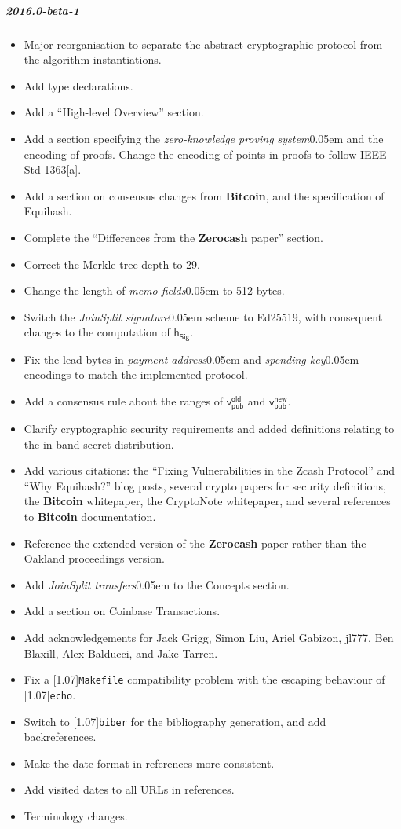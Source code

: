 \documentclass{article}
\let\oldtexttt\texttt
\renewcommand{\texttt}[1]{\scalebox{1.02}[1.07]{\oldtexttt{#1}}}
\newcommand{\term}[1]{\textsl{#1}\kern 0.05em\xspace}
\newcommand{\termbf}[1]{\textbf{#1}\xspace}
\newcommand{\Zerocash}{\termbf{Zerocash}}
\newcommand{\Bitcoin}{\termbf{Bitcoin}}
\newcommand{\joinSplitTransfers}{\term{JoinSplit transfers}}
\newcommand{\joinSplitSignature}{\term{JoinSplit signature}}
\newcommand{\zeroKnowledgeProvingSystem}{\term{zero-knowledge proving system}}
\newcommand{\paymentAddress}{\term{payment address}}
\newcommand{\spendingKey}{\term{spending key}}
\newcommand{\memos}{\term{memo fields}}
\newcommand{\hSig}{\mathsf{h_{Sig}}}
\newcommand{\vpubOld}{\mathsf{v_{pub}^{old}}}
\newcommand{\vpubNew}{\mathsf{v_{pub}^{new}}}
\begin{document}
\subparagraph{2016.0-beta-1}

\begin{itemize}
    \item Major reorganisation to separate the abstract cryptographic protocol
          from the algorithm instantiations.
    \item Add type declarations.
    \item Add a ``High-level Overview'' section.
    \item Add a section specifying the \zeroKnowledgeProvingSystem and the
          encoding of proofs. Change the encoding of points in proofs to follow
          IEEE Std 1363[a].
    \item Add a section on consensus changes from \Bitcoin, and the specification
          of Equihash.
    \item Complete the ``Differences from the \Zerocash paper'' section.
    \item Correct the Merkle tree depth to 29.
    \item Change the length of \memos to 512 bytes.
    \item Switch the \joinSplitSignature scheme to Ed25519, with consequent
          changes to the computation of $\hSig$.
    \item Fix the lead bytes in \paymentAddress and \spendingKey encodings to
          match the implemented protocol.
    \item Add a consensus rule about the ranges of $\vpubOld$ and $\vpubNew$.
    \item Clarify cryptographic security requirements and added definitions
          relating to the in-band secret distribution.
    \item Add various citations: the ``Fixing Vulnerabilities in the Zcash
          Protocol'' and ``Why Equihash?'' blog posts, several crypto papers
          for security definitions, the \Bitcoin whitepaper, the CryptoNote
          whitepaper, and several references to \Bitcoin documentation.
    \item Reference the extended version of the \Zerocash paper rather than the
          Oakland proceedings version.
    \item Add \joinSplitTransfers to the Concepts section.
    \item Add a section on Coinbase Transactions.
    \item Add acknowledgements for Jack Grigg, Simon Liu, Ariel Gabizon, jl777,
          Ben Blaxill, Alex Balducci, and Jake Tarren.
    \item Fix a \texttt{Makefile} compatibility problem with the escaping behaviour
          of \texttt{echo}.
    \item Switch to \texttt{biber} for the bibliography generation, and add
          backreferences.
    \item Make the date format in references more consistent.
    \item Add visited dates to all URLs in references.
    \item Terminology changes.
\end{itemize}
\end{document}
